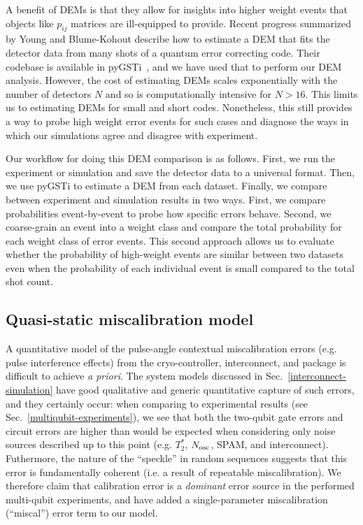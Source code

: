 \documentclass[aps,prl,twocolumn,superscriptaddress,nobibnotes,10pt,floatfix]{revtex4-2}
\newcommand{\secref}[1]{Sec.~\ref{#1}}
\newcommand{\ts}[2]{{#1}_{\textnormal{#2}}}
\newcommand{\Nosc}{\ensuremath{\ts{N}{osc}}}
\begin{document}
A benefit of DEMs is that they allow for insights into higher weight events that objects like \(p_{ij}\) matrices are ill-equipped to provide.
Recent progress summarized by Young and \mbox{Blume-Kohout} \cite{s_blume-kohout_estimating_2025} describe how to estimate a DEM that fits the detector data from many shots of a quantum error correcting code.
Their codebase is available in pyGSTi~\cite{s_pygsti_DEM}, and we have used that to perform our DEM analysis.
However, the cost of estimating DEMs scales exponentially with the number of detectors \(N\) and so is computationally intensive for \(N > 16\).
This limits us to estimating DEMs for small and short codes.
Nonetheless, this still provides a way to probe high weight error events for such cases and diagnose the ways in which our simulations agree and disagree with experiment.

Our workflow for doing this DEM comparison is as follows.
First, we run the experiment or simulation and save the detector data to a universal format.
Then, we use pyGSTi to estimate a DEM from each dataset.
Finally, we compare between experiment and simulation results in two ways.
First, we compare probabilities event-by-event to probe how specific errors behave.
Second, we coarse-grain an event into a weight class and compare the total probability for each weight class of error events.
This second approach allows us to evaluate whether the probability of high-weight events are similar between two datasets even when the probability of each individual event is small compared to the total shot count.

\subsection{Quasi-static miscalibration model}\label{quasi-static-miscalibration-model}

A quantitative model of the pulse-angle contextual miscalibration errors (e.g. pulse interference effects) from the cryo-controller, interconnect, and package is difficult to achieve \emph{a priori}.
The system models discussed in \secref{interconnect-simulation} have good qualitative and generic quantitative capture of such errors, and they certainly occur: when comparing to experimental results (see \secref{multiqubit-experiments}), we see that both the two-qubit gate errors and circuit errors are higher than would be expected when considering only noise sources described up to this point (e.g. \(T_{2}^{*}\), \(\Nosc\), SPAM, and interconnect).
Futhermore, the nature of the ``speckle'' in random sequences suggests that this error is fundamentally coherent (i.e. a result of repeatable miscalibration).
We therefore claim that calibration error is a \emph{dominant} error source in the performed multi-qubit experiments, and have added a single-parameter miscalibration (``miscal'') error term to our model.
\end{document}
